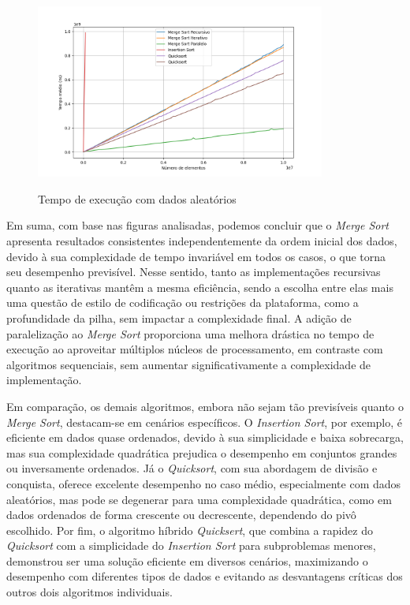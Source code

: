 \documentclass[12pt]{article}
\begin{document}
\begin{figure}[ht]
\centering
\caption{Tempo de execução com dados aleatórios}
\includegraphics[width=0.85\textwidth]{time_random.png}
\label{fig:rand}
\end{figure}

Em suma, com base nas figuras analisadas, podemos concluir que o \textit{Merge Sort} apresenta resultados consistentes independentemente da ordem inicial dos dados, devido à sua complexidade de tempo invariável em todos os casos, o que torna seu desempenho previsível. Nesse sentido, tanto as implementações recursivas quanto as iterativas mantêm a mesma eficiência, sendo a escolha entre elas mais uma questão de estilo de codificação ou restrições da plataforma, como a profundidade da pilha, sem impactar a complexidade final. A adição de paralelização ao \textit{Merge Sort} proporciona uma melhora drástica no tempo de execução ao aproveitar múltiplos núcleos de processamento, em contraste com algoritmos sequenciais, sem aumentar significativamente a complexidade de implementação.

Em comparação, os demais algoritmos, embora não sejam tão previsíveis quanto o \textit{Merge Sort}, destacam-se em cenários específicos. O \textit{Insertion Sort}, por exemplo, é eficiente em dados quase ordenados, devido à sua simplicidade e baixa sobrecarga, mas sua complexidade quadrática prejudica o desempenho em conjuntos grandes ou inversamente ordenados. Já o \textit{Quicksort}, com sua abordagem de divisão e conquista, oferece excelente desempenho no caso médio, especialmente com dados aleatórios, mas pode se degenerar para uma complexidade quadrática, como em dados ordenados de forma crescente ou decrescente, dependendo do pivô escolhido. Por fim, o algoritmo híbrido \textit{Quicksert}, que combina a rapidez do \textit{Quicksort} com a simplicidade do \textit{Insertion Sort} para subproblemas menores, demonstrou ser uma solução eficiente em diversos cenários, maximizando o desempenho com diferentes tipos de dados e evitando as desvantagens críticas dos outros dois algoritmos individuais.
\end{document}
